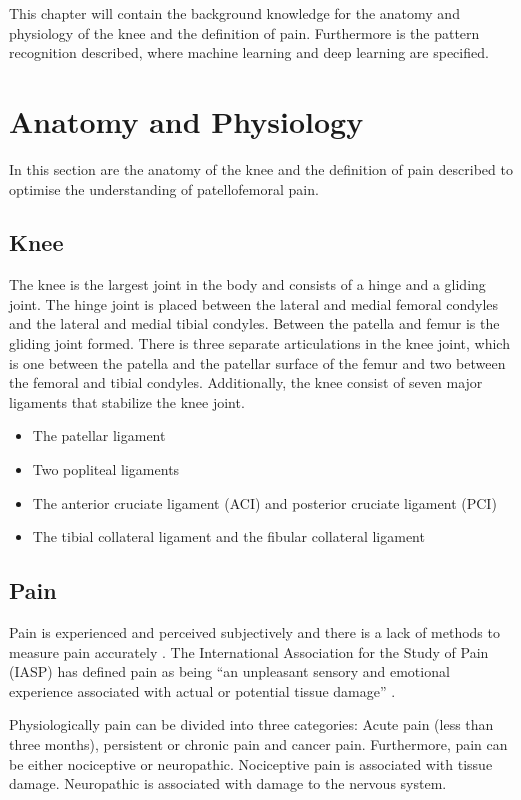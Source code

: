 This chapter will contain the background knowledge for the anatomy and physiology of the knee and the definition of pain. Furthermore is the pattern recognition described, where machine learning and deep learning are specified. 

\section{Anatomy and Physiology}
In this section are the anatomy of the knee and the definition of pain described to optimise the understanding of patellofemoral pain. 

\subsection{Knee}
The knee is the largest joint in the body and consists of a hinge and a gliding joint. The hinge joint is placed between the lateral and medial femoral condyles and the lateral and medial tibial condyles. Between the patella and femur is the gliding joint formed.
There is three separate articulations in the knee joint, which is one between the patella and the patellar surface of the femur and two between the femoral and tibial condyles. Additionally, the knee consist of seven major ligaments that stabilize the knee joint.\citep{Martini2012} 

\begin{itemize}
\item The patellar ligament 
\item Two popliteal ligaments
\item The anterior cruciate ligament (ACI) and posterior cruciate ligament (PCI) 
\item The tibial collateral ligament and the fibular collateral ligament \citep{Martini2012}
\end{itemize}

\subsection{Pain}
Pain is experienced and perceived subjectively and there is a lack of methods to measure pain accurately \citep{IASP2012, Younger2009}. 
The International Association for the Study of Pain (IASP) has defined pain as being “an unpleasant sensory and emotional experience associated with actual or potential tissue damage” \citep{IASP2012}.

Physiologically pain can be divided into three categories: Acute pain (less than three months), persistent or chronic pain and cancer pain. Furthermore, pain can be either nociceptive or neuropathic. Nociceptive pain is associated with tissue damage. Neuropathic is associated with damage to the nervous system.\citep{Briggs2010} 
